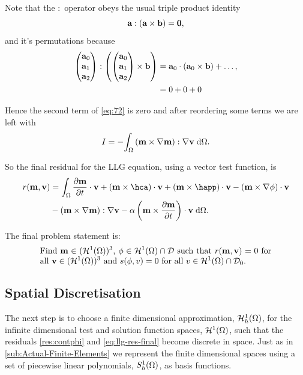 Note that the $:$ operator obeys the usual triple product identity
\begin{equation}
  {\mathbf{a}} : ({\mathbf{a}} \times {\mathbf{b}}) = \mathbf{0},
  \label{triple:-identity}
\end{equation}
and it's permutations because
\begin{equation}
  \begin{aligned} 
    \begin{pmatrix} {\mathbf{a}}_0 \\ {\mathbf{a}}_1 \\ {\mathbf{a}}_2 \end{pmatrix} : {\left( \begin{pmatrix} {\mathbf{a}}_0 \\ {\mathbf{a}}_1 \\ {\mathbf{a}}_2 \end{pmatrix} \times {\mathbf{b}} \right)} &= {\mathbf{a}}_0 \cdot ({\mathbf{a}}_0 \times {\mathbf{b}}) + \ldots, \\
    & = 0 + 0 + 0
  \end{aligned}
\end{equation}

Hence the second term of \eqref{eq:72} is zero and after reordering some terms we are left with
\begin{equation}
  \label{eq:final-lap-residual}
  I = - {\int_{\Omega} {\left( \mathbf{m} \times \nabla \mathbf{m} \right)} : \nabla \mathbf{v} {\; \text{d}} {\Omega}}.
\end{equation}

So the final residual for the LLG equation, using a vector test function, is
\begin{equation}
  \begin{aligned}
    \label{eq:llg-res-final}
    \rllg(\mv, \testv) &= \int_\magd \dmdt\cdot \testv
    + (\mv \times \hca)\cdot \testv 
    + (\mv \times \happ)\cdot \testv 
    - (\mv \times \nabla \phi)\cdot \testv \\
    & - \bigb{\mv \times \grad \mv} : \grad \testv
    - \dampc \left( \mv \times \dmdt \right)\cdot \testv
    \d\magd.
  \end{aligned}
\end{equation}

The final problem statement is: 
\begin{equation}
  \eqpar{Find $\mv \in (\tsinf)^3$, $\phim \in \tsinf \cap \Dfs$ such that $\rllg(\mv, \testv) = 0$ for all $\testv \in (\tsinf)^3$ and $\rphi(\phim, \test) = 0$ for all $\test \in \tsinf \cap \Dfs_0$.}
\label{eq:inf-dim-problem}
\end{equation}




\subsection{Spatial Discretisation}
\label{sec:spat-discr-resi}

The next step is to choose a finite dimensional approximation, ${\mathcal{H}^1_h(\Omega)}$, for the infinite dimensional test and solution function spaces, ${\mathcal{H}^1(\Omega)}$, such that the residuals \eqref{res:contphi} and \eqref{eq:llg-res-final} become discrete in space.
Just as in \autoref{sub:Actual-Finite-Elements} we represent the finite dimensional spaces using a set of piecewise linear polynomials, ${S_h^1(\Omega)}$, as basis functions.

